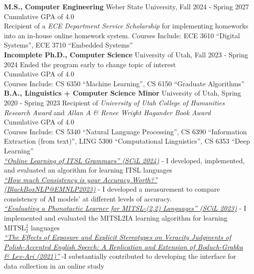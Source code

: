 \documentclass[a4paper,10pt]{article}
\newcommand{\resumeSection}[1]{\vspace{2pt}\noindent{\Large \textbf{#1}}\vspace{1pt}\newline}
\newcommand{\resumeSubsection}[2]{\noindent\textbf{#1} \hfill #2\newline}
\begin{document}
\resumeSection{Education}
    \resumeSubsection{M.S., Computer Engineering}{Weber State University, Fall 2024 - Spring 2027}
        Cumulative GPA of 4.0 \\
        Recipient of a \textit{ECE Department Service Scholarship} for implementing homeworks into an in-house online homework system.
        Courses Include: ECE 3610 ``Digital Systems'', ECE 3710 ``Embedded Systems'' \\
    \resumeSubsection{Incomplete Ph.D., Computer Science}{University of Utah, Fall 2023 - Spring 2024}
        Ended the program early to change topic of interest \\
        Cumulative GPA of 4.0 \\
        Courses Include: CS 6350 ``Machine Learning'', CS 6150 ``Graduate Algorithms'' \\
    \resumeSubsection{B.A., Linguistics + Computer Science Minor}{University of Utah, Spring 2020 - Spring 2023}
        Recipient of \textit{University of Utah College of Humanities Research Award} and \textit{Allan A & Renee Wright Hagander Book Award} \\
        Cumulative GPA of 4.0 \\
        Courses Include: CS 5340 ``Natural Language Processing'', CS 6390 ``Information Extraction (from text)'', LING 5300 ``Computational Linguistics'', CS 6353 ``Deep Learning'' \\

\resumeSection{Academic Publications}
    \textit{{\href{https://aclanthology.org/2024.scil-1.23/}{``Online Learning of ITSL Grammars'' (SCiL 2024)}}}
        - I developed, implemented, and evaluated an algorithm for learning ITSL languages\\
    \textit{{\href{https://aclanthology.org/2023.blackboxnlp-1.19/}{``How much Consistency is your Accuracy Worth?'' (BlackBoxNLP@EMNLP2023)}} }
        - I developed a measurement to compare consistency of AI models' at different levels of accuracy. \\
    \textit{\href{https://scholarworks.umass.edu/cgi/viewcontent.cgi?article=1268\&context=scil}{``Evaluating a Phonotactic Learner for MITSL-(2,2) Languages'' (SCiL 2023)}} 
        - I implemented and evaluated the {MITSL2IA learning algorithm} for learning MITSL$_2^2$ languages\\
    \textit{{\href{{https://www.cambridge.org/core/journals/studies-in-second-language-acquisition/article/effects-of-exposure-and-explicit-stereotypes-on-veracity-judgments-of-polishaccented-english-speech-a-preregistered-close-replication-and-extension-of-boduchgrabka-levari-2021/EF03B7A762B1442206B537F0AD4447A4}}{``The Effects of Exposure and Explicit Stereotypes on Veracity Judgments of Polish-Accented English Speech: A Replication and Extension of Boduch-Grabka \& Lev-Ari (2021)''}}} 
        -I substantially contributed to developing the interface for data collection in an online study\\
\end{document}
